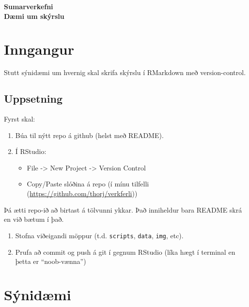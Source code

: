 \documentclass[10pt,]{article}
\author{}
\date{\vspace{-2.5em}}
\begin{document}
\begin{center}
\LARGE{\textbf{Sumarverkefni}}\\
\vspace*{2\baselineskip}
\Large{\textbf{Dæmi um skýrslu}}
\end{center}
\thispagestyle{empty}
\newpage

\hypertarget{inngangur}{%
\section{Inngangur}\label{inngangur}}

Stutt sýnidæmi um hvernig skal skrifa skýrslu í RMarkdown með version-control.

\hypertarget{uppsetning}{%
\subsection{Uppsetning}\label{uppsetning}}

Fyrst skal:

\begin{enumerate}
\def\labelenumi{\arabic{enumi}.}
\item
  Búa til nýtt repo á github (helst með README).
\item
  Í RStudio:

  \begin{itemize}
  \item
    File -\textgreater{} New Project -\textgreater{} Version Control
  \item
    Copy/Paste slóðina á repo (í mínu tilfelli (\url{https://github.com/thorj/verkferli}))
  \end{itemize}
\end{enumerate}

Þá ætti repo-ið að birtast á tölvunni ykkar. Það inniheldur bara README skrá en við bætum í það.

\begin{enumerate}
\def\labelenumi{\arabic{enumi}.}
\setcounter{enumi}{2}
\item
  Stofna viðeigandi möppur (t.d. \texttt{scripts}, \texttt{data}, \texttt{img}, etc).
\item
  Prufa að commit og push á git í gegnum RStudio (líka hægt í terminal en þetta er ``noob-vænna'')
\end{enumerate}

\hypertarget{suxfdniduxe6mi}{%
\section{Sýnidæmi}\label{suxfdniduxe6mi}}
\end{document}
